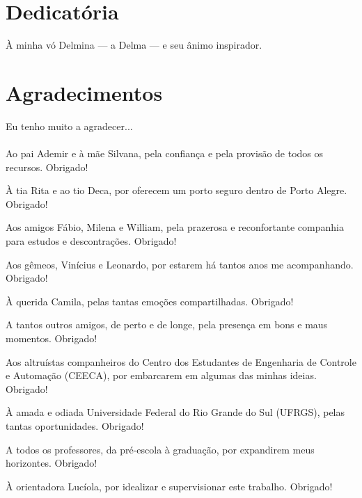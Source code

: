 \documentclass[repeatfields,oneside]{tcc}
\begin{document}
\maketitle


\chapter*{Dedicatória}

À minha vó Delmina --- a Delma --- e seu ânimo inspirador.

\chapter*{Agradecimentos}

Eu tenho muito a agradecer...
\\\\

Ao pai Ademir e à mãe Silvana, pela confiança e pela provisão de todos os recursos. Obrigado!

À tia Rita e ao tio Deca, por oferecem um porto seguro dentro de Porto Alegre. Obrigado!


Aos amigos Fábio, Milena e William, pela prazerosa e reconfortante companhia para estudos e descontrações. Obrigado!

Aos gêmeos, Vinícius e Leonardo, por estarem há tantos anos me acompanhando. Obrigado!

À querida Camila, pelas tantas emoções compartilhadas. Obrigado!

A tantos outros amigos, de perto e de longe, pela presença em bons e maus momentos. Obrigado!

Aos altruístas companheiros do Centro dos Estudantes de Engenharia de Controle e Automação (CEECA), por embarcarem em algumas das minhas ideias. Obrigado!

À amada e odiada Universidade Federal do Rio Grande do Sul (UFRGS), pelas tantas oportunidades. Obrigado!

A todos os professores, da pré-escola à graduação, por expandirem meus horizontes. Obrigado!

À orientadora Lucíola, por idealizar e supervisionar este trabalho. Obrigado!
\end{document}
